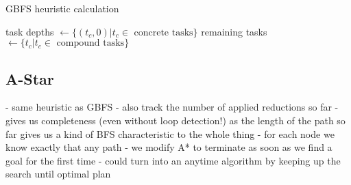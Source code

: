 \begin{algorithm}
	\caption{GBFS heuristic calculation}
	task depths $\gets \{(t_c, 0) | t_c \in \text{ concrete tasks}\}$\;
	remaining tasks $\gets \{t_c | t_c \in \text{ compound tasks}\}$\;
\end{algorithm}


\subsection{A-Star}
- same heuristic as GBFS
- also track the number of applied reductions so far
- gives us completeness (even without loop detection!) as the length of the path so far gives us a kind of BFS characteristic to the whole thing
- for each node we know exactly that any path
- we modify A* to terminate as soon as we find a goal for the first time
- could turn into an anytime algorithm by keeping up the search until optimal plan
